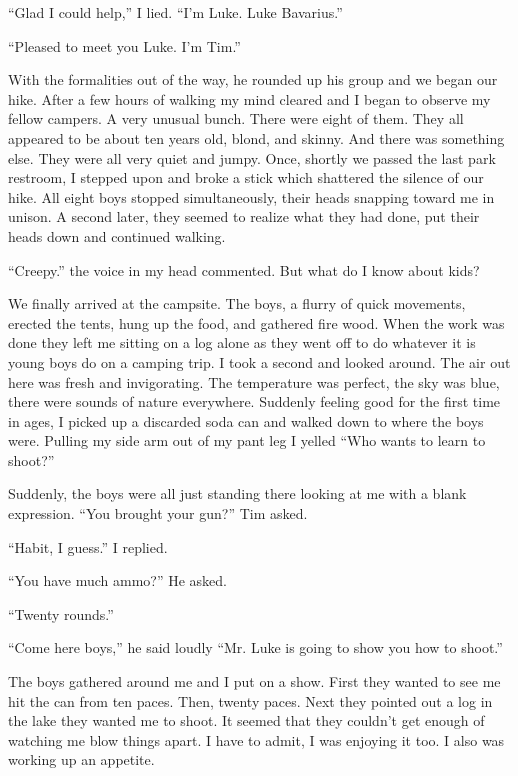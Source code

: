 ``Glad I could help,'' I lied. ``I'm Luke. Luke Bavarius.''



``Pleased to meet you Luke. I'm Tim.''



With the formalities out of the way, he rounded up his group and we
began our hike. After a few hours of walking my mind cleared and I
began to observe my fellow campers. A very unusual bunch. There
were eight of them. They all appeared to be about ten years old,
blond, and skinny. And there was something else. They were all very
quiet and jumpy. Once, shortly we passed the last park restroom, I
stepped upon and broke a stick which shattered the silence of our
hike. All eight boys stopped simultaneously, their heads snapping
toward me in unison. A second later, they seemed to realize what
they had done, put their heads down and continued walking.



``Creepy.'' the voice in my head commented. But what do I know about
kids?



We finally arrived at the campsite. The boys, a flurry of quick
movements, erected the tents, hung up the food, and gathered fire
wood. When the work was done they left me sitting on a log alone as
they went off to do whatever it is young boys do on a camping trip.
I took a second and looked around. The air out here was fresh and
invigorating. The temperature was perfect, the sky was blue, there
were sounds of nature everywhere. Suddenly feeling good for the
first time in ages, I picked up a discarded soda can and walked
down to where the boys were. Pulling my side arm out of my pant leg
I yelled ``Who wants to learn to shoot?''



Suddenly, the boys were all just standing there looking at me with
a blank expression. ``You brought your gun?'' Tim asked.



``Habit, I guess.'' I replied.



``You have much ammo?'' He asked.



``Twenty rounds.''



``Come here boys,'' he said loudly ``Mr. Luke is going to show you how
to shoot.''



The boys gathered around me and I put on a show. First they wanted
to see me hit the can from ten paces. Then, twenty paces. Next they
pointed out a log in the lake they wanted me to shoot. It seemed
that they couldn't get enough of watching me blow things apart. I
have to admit, I was enjoying it too. I also was working up an
appetite.



